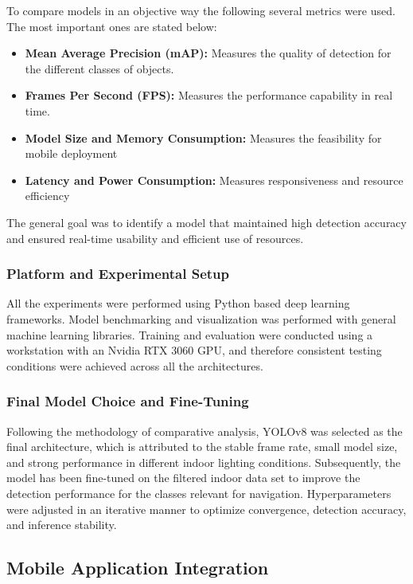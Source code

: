 \documentclass{FastFyp}
\begin{document}
To compare models in an objective way the following several metrics were used. The most important ones are stated below:

\begin{itemize}
    \item \textbf{Mean Average Precision (mAP):} Measures the quality of detection for the different classes of objects.
    \item \textbf{Frames Per Second (FPS):} Measures the performance capability in real time.
    \item \textbf{Model Size and Memory Consumption:} Measures the feasibility for mobile deployment
    \item \textbf{Latency and Power Consumption:} Measures responsiveness and resource efficiency
\end{itemize}

The general goal was to identify a model that maintained high detection accuracy and ensured real-time usability and efficient use of resources.

\subsubsection{Platform and Experimental Setup}

All the experiments were performed using Python based deep learning frameworks. Model benchmarking and visualization was performed with general machine learning libraries. Training and evaluation were conducted using a workstation with an Nvidia RTX 3060 GPU, and therefore consistent testing conditions were achieved across all the architectures.

\subsubsection{Final Model Choice and Fine-Tuning}

Following the methodology of comparative analysis, YOLOv8 was selected as the final architecture, which is attributed to the stable frame rate, small model size, and strong performance in different indoor lighting conditions. Subsequently, the model has been fine-tuned on the filtered indoor data set to improve the detection performance for the classes relevant for navigation. Hyperparameters were adjusted in an iterative manner to optimize convergence, detection accuracy, and inference stability.


\subsection{Mobile Application Integration}
\end{document}
